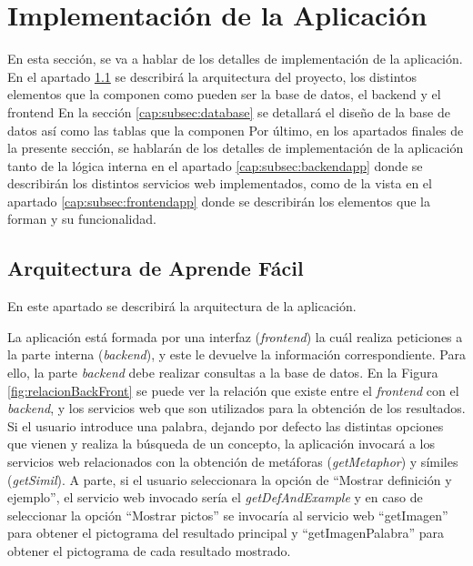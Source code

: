 \section{Implementación de la Aplicación}
\label{cap:sec:implementacionApp}

En esta sección, se va a hablar de los detalles de implementación de la aplicación. En el apartado \ref{cap:subsec:arquitectura} se describirá la arquitectura del proyecto, los distintos elementos que la componen como pueden ser la base de datos, el backend y el frontend En la sección \ref{cap:subsec:database} se detallará el diseño de la base de datos así como las tablas que la componen Por último, en los apartados finales de la presente sección, se hablarán de los detalles de implementación de la aplicación tanto de la lógica interna en el apartado \ref{cap:subsec:backendapp} donde se describirán los distintos servicios web implementados, como de la vista en el apartado \ref{cap:subsec:frontendapp} donde se describirán los elementos que la forman y su funcionalidad.


\subsection{Arquitectura de Aprende Fácil}
\label{cap:subsec:arquitectura}
En este apartado se describirá la arquitectura de la aplicación. 

La aplicación está formada por una interfaz (\textit{frontend}) la cuál realiza peticiones a la parte interna (\textit{backend}), y este le devuelve la información correspondiente. Para ello, la parte \textit{backend} debe realizar consultas a la base de datos. En la Figura \ref{fig:relacionBackFront}  se puede ver la relación que existe entre el \textit{frontend} con el \textit{backend}, y los servicios web que son utilizados para la obtención de los resultados.
Si el usuario introduce una palabra, dejando por defecto las distintas opciones que vienen y realiza la búsqueda de un concepto, la aplicación invocará a los servicios web relacionados con la obtención de metáforas (\textit{getMetaphor}) y símiles (\textit{getSimil}). A parte, si el usuario seleccionara la opción de ``Mostrar definición y ejemplo'', el servicio web invocado sería el \textit{getDefAndExample} y en caso de seleccionar la opción  ``Mostrar pictos'' se invocaría al servicio web ``getImagen'' para obtener el pictograma del resultado principal y ``getImagenPalabra'' para obtener el pictograma de cada resultado mostrado.

